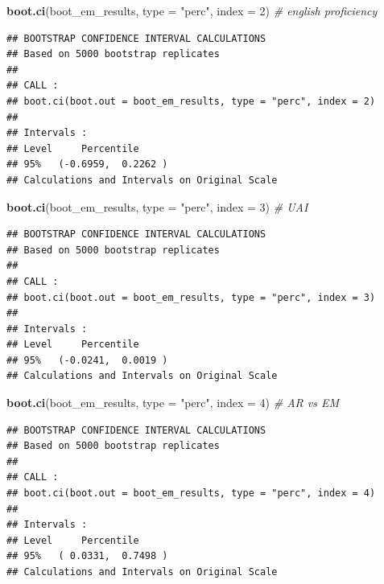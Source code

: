 \documentclass[
]{article}
\newenvironment{Shaded}{\begin{snugshade}}{\end{snugshade}}
\newcommand{\AttributeTok}[1]{\textcolor[rgb]{0.13,0.29,0.53}{#1}}
\newcommand{\CommentTok}[1]{\textcolor[rgb]{0.56,0.35,0.01}{\textit{#1}}}
\newcommand{\DecValTok}[1]{\textcolor[rgb]{0.00,0.00,0.81}{#1}}
\newcommand{\FunctionTok}[1]{\textcolor[rgb]{0.13,0.29,0.53}{\textbf{#1}}}
\newcommand{\NormalTok}[1]{#1}
\newcommand{\StringTok}[1]{\textcolor[rgb]{0.31,0.60,0.02}{#1}}
\begin{document}
\begin{Shaded}
\begin{Highlighting}[]
\FunctionTok{boot.ci}\NormalTok{(boot\_em\_results, }\AttributeTok{type =} \StringTok{"perc"}\NormalTok{, }\AttributeTok{index =} \DecValTok{2}\NormalTok{) }\CommentTok{\# english proficiency}
\end{Highlighting}
\end{Shaded}

\begin{verbatim}
## BOOTSTRAP CONFIDENCE INTERVAL CALCULATIONS
## Based on 5000 bootstrap replicates
## 
## CALL : 
## boot.ci(boot.out = boot_em_results, type = "perc", index = 2)
## 
## Intervals : 
## Level     Percentile     
## 95%   (-0.6959,  0.2262 )  
## Calculations and Intervals on Original Scale
\end{verbatim}

\begin{Shaded}
\begin{Highlighting}[]
\FunctionTok{boot.ci}\NormalTok{(boot\_em\_results, }\AttributeTok{type =} \StringTok{"perc"}\NormalTok{, }\AttributeTok{index =} \DecValTok{3}\NormalTok{) }\CommentTok{\# UAI}
\end{Highlighting}
\end{Shaded}

\begin{verbatim}
## BOOTSTRAP CONFIDENCE INTERVAL CALCULATIONS
## Based on 5000 bootstrap replicates
## 
## CALL : 
## boot.ci(boot.out = boot_em_results, type = "perc", index = 3)
## 
## Intervals : 
## Level     Percentile     
## 95%   (-0.0241,  0.0019 )  
## Calculations and Intervals on Original Scale
\end{verbatim}

\begin{Shaded}
\begin{Highlighting}[]
\FunctionTok{boot.ci}\NormalTok{(boot\_em\_results, }\AttributeTok{type =} \StringTok{"perc"}\NormalTok{, }\AttributeTok{index =} \DecValTok{4}\NormalTok{) }\CommentTok{\# AR vs EM}
\end{Highlighting}
\end{Shaded}

\begin{verbatim}
## BOOTSTRAP CONFIDENCE INTERVAL CALCULATIONS
## Based on 5000 bootstrap replicates
## 
## CALL : 
## boot.ci(boot.out = boot_em_results, type = "perc", index = 4)
## 
## Intervals : 
## Level     Percentile     
## 95%   ( 0.0331,  0.7498 )  
## Calculations and Intervals on Original Scale
\end{verbatim}
\end{document}
